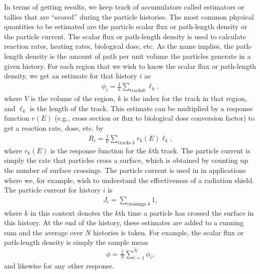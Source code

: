 In terms of getting results, we keep track of accumulators called estimators or tallies that are ``scored'' during the particle histories. The most common physical quantities to be estimated are the particle scalar flux or path-length density or the particle current. The scalar flux or path-length density is used to calculate reaction rates, heating rates, biological dose, etc. As the name implies, the path-length density is the amount of path per unit volume the particles generate in a given history. For each region that we wish to know the scalar flux or path-length density, we get an estimate for that history $i$ as
\begin{align}
  \phi_i = \frac{1}{V} \sum_{\textrm{tracks} k} \ell_k ,
\end{align}
where $V$ is the volume of the region, $k$ is the index for the track in that region, and $\ell_k$ is the length of the track. This estimate can be multiplied by a response function $r(E)$ (e.g., cross section or flux to biological dose conversion factor) to get a reaction rate, dose, etc. by
\begin{align}
  R_i = \frac{1}{V} \sum_{\textrm{tracks } k} r_k(E) \ell_k ,
\end{align}
where $r_k(E)$ is the response function for the $k$th track. The particle current is simply the rate that particles cross a surface, which is obtained by counting up the number of surface crossings. The particle current is used in in applications where we, for example, wish to understand the effectiveness of a radiation shield. The particle current for history $i$ is
\begin{align}
  J_i = \sum_{\textrm{crossings } k} 1,
\end{align}
where $k$ in this context denotes the $k$th time a particle has crossed the surface in this history. At the end of the history, these estimates are added to a running sum and the average over $N$ histories is taken. For example, the scalar flux or path-length density is simply the sample mean
\begin{align}
  \phi = \frac{1}{N} \sum_{i=1}^N \phi_i ,
\end{align}
and likewise for any other response.

